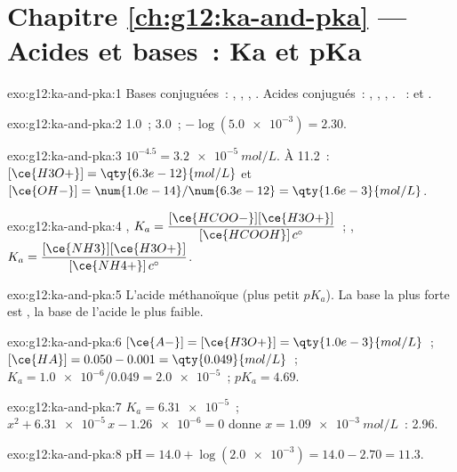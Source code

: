 \section*{Chapitre \ref{ch:g12:ka-and-pka} --- Acides et bases~: Ka et pKa}

\begin{solution}{exo:g12:ka-and-pka:1}
Bases conjuguées~: , , , .
Acides conjugués~: , , , .
~: 
et .
\end{solution}

\begin{solution}{exo:g12:ka-and-pka:2}
 1.0~; 3.0~; $-\log(\num{5.0e-3}) = 2.30$.
\end{solution}

\begin{solution}{exo:g12:ka-and-pka:3}
$10^{-4.5} = \qty{3.2e-5}{mol/L}$. À  11.2~:
$[\ce{H3O+}] = \qty{6.3e-12}{mol/L}$ et
$[\ce{OH-}] = \num{1.0e-14}/\num{6.3e-12} = \qty{1.6e-3}{mol/L}$.
\end{solution}

\begin{solution}{exo:g12:ka-and-pka:4}
,
$K_a = \dfrac{[\ce{HCOO-}][\ce{H3O+}]}{[\ce{HCOOH}]\,c^\circ}$~;
,
$K_a = \dfrac{[\ce{NH3}][\ce{H3O+}]}{[\ce{NH4+}]\,c^\circ}$.
\end{solution}

\begin{solution}{exo:g12:ka-and-pka:5}
L'acide méthanoïque (plus petit $pK_a$). La base la plus forte est
, la base de l'acide le plus faible.
\end{solution}

\begin{solution}{exo:g12:ka-and-pka:6}
$[\ce{A-}] = [\ce{H3O+}] = \qty{1.0e-3}{mol/L}$~;
$[\ce{HA}] = 0.050 - 0.001 = \qty{0.049}{mol/L}$~;
$K_a = \num{1.0e-6}/0.049 = \num{2.0e-5}$~; $pK_a = 4.69$.
\end{solution}

\begin{solution}{exo:g12:ka-and-pka:7}
$K_a = \num{6.31e-5}$~; $x^2 + \num{6.31e-5}\,x - \num{1.26e-6} = 0$
donne
$x = \qty{1.09e-3}{mol/L}$~:  2.96.
\end{solution}

\begin{solution}{exo:g12:ka-and-pka:8}
$\mathrm{pH} = 14.0 + \log(\num{2.0e-3}) = 14.0 - 2.70 = 11.3$.
\end{solution}

